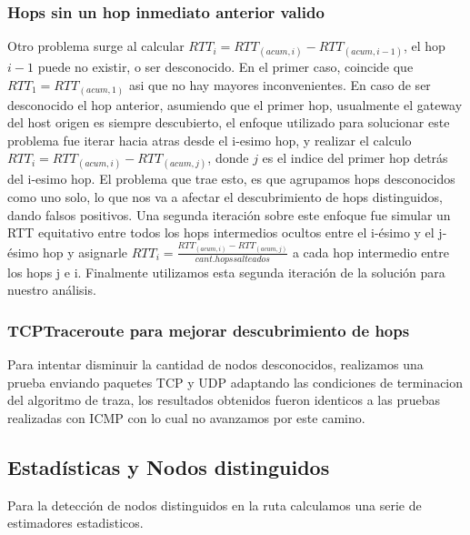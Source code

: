 \subsubsection{Hops sin un hop inmediato anterior valido}
Otro problema surge al calcular $RTT_i = RTT_{(acum, i)} - RTT_{(acum, i-1)}$, 
el hop $i-1$ puede no existir, o ser desconocido. En el primer caso, coincide que $RTT_1 = RTT_{(acum, 1)}$ asi que no hay mayores inconvenientes. En caso de ser desconocido el hop anterior, asumiendo que el primer hop, usualmente el gateway del host origen es siempre descubierto, el enfoque utilizado para solucionar este problema fue iterar hacia atras desde el i-esimo hop, y realizar el calculo $RTT_i = RTT_{(acum, i)} - RTT_{(acum, j)}$, donde $j$ es el indice del primer hop detr\'as del i-esimo hop. El problema que trae esto, es que agrupamos hops desconocidos como uno solo, lo que nos va a afectar el descubrimiento de hops distinguidos, dando falsos positivos. Una segunda iteración sobre este enfoque fue simular un RTT equitativo entre todos los hops intermedios ocultos entre el i-ésimo y el j-ésimo hop y asignarle $RTT_i = \frac{RTT_{(acum, i)} - RTT_{(acum, j)}}{cant. hops salteados}$ a cada hop intermedio entre los hops j e i. Finalmente utilizamos esta segunda iteración de la solución para nuestro análisis.


\subsubsection{TCPTraceroute para mejorar descubrimiento de hops}
Para intentar disminuir la cantidad de nodos desconocidos, realizamos una prueba enviando paquetes TCP y UDP adaptando las condiciones de terminacion del algoritmo de traza, los resultados obtenidos fueron identicos a las pruebas realizadas con ICMP con lo cual no avanzamos por este camino.

\subsection{Estadísticas y Nodos distinguidos}
Para la detección de nodos distinguidos en la ruta calculamos una serie de estimadores estadisticos.
